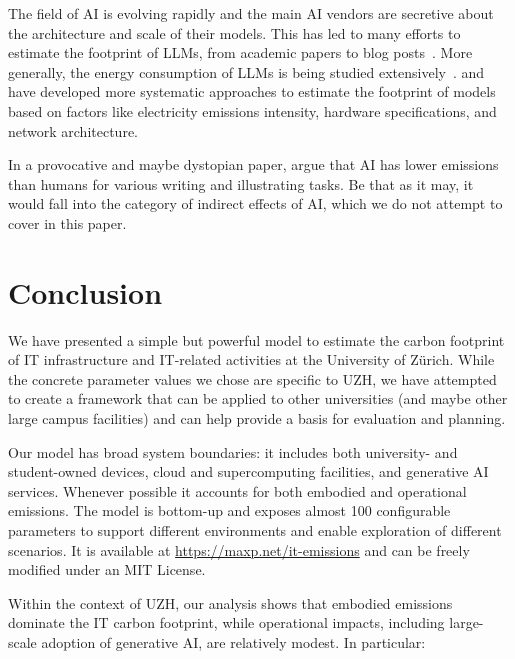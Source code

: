 \documentclass[11pt]{article}
\begin{document}
The field of AI is evolving rapidly and the main AI vendors are secretive about the architecture and scale of their models. This has led to many efforts to estimate the footprint of LLMs, from academic papers to blog posts~\cite{devries2023growing,heguerte2023estimate,luccioni2022estimating,ritchie:chatgpt,epoch2025howmuchenergydoeschatgptuse}. More generally, the energy consumption of LLMs is being studied extensively~\cite{budennyy2022eco2ai,castano2023exploring,epoch2024optimallyallocatingcomputebetweeninferenceandtraining,gowda2024watt,harding2024watts,luccioni2023counting,patterson2021carbon,rodriguez2024evaluating,tripp2024measuring}. \textcite{lacoste:mlco2} and \textcite{faiz2024llmcarbon} have developed more systematic approaches to estimate the footprint of models based on factors like electricity emissions intensity, hardware specifications, and network architecture.

In a provocative and maybe dystopian paper, \textcite{tomlinson:2024:carbon} argue that AI has lower emissions than humans for various writing and illustrating tasks. Be that as it may, it would fall into the category of indirect effects of AI, which we do not attempt to cover in this paper.

\section{Conclusion}

We have presented a simple but powerful model to estimate the carbon footprint of IT infrastructure and IT-related activities at the University of Zürich. While the concrete parameter values we chose are specific to UZH, we have attempted to create a framework that can be applied to other universities (and maybe other large campus facilities) and can help provide a basis for evaluation and planning.

Our model has broad system boundaries: it includes both university- and student-owned devices, cloud and supercomputing facilities, and generative AI services. Whenever possible it accounts for both embodied and operational emissions. The model is bottom-up and exposes almost 100 configurable parameters to support different environments and enable exploration of different scenarios. It is available at \url{https://maxp.net/it-emissions} and can be freely modified under an MIT License.

Within the context of UZH, our analysis shows that embodied emissions dominate the IT carbon footprint, while operational impacts, including large-scale adoption of generative AI, are relatively modest. In particular:
\end{document}
